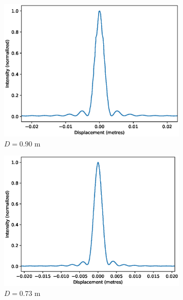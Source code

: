 \documentclass[11pt]{article}
\begin{document}
        \begin{figure}[H]
        \centering
        \begin{subfigure}[b]{0.49\textwidth}
                \includegraphics[width=\textwidth]{Slit1.eps}
                \caption{$D = 0.90$ m}
        \end{subfigure}
        \begin{subfigure}[b]{0.49\textwidth}
                \includegraphics[width=\textwidth]{Slit2.eps}
                \caption{$D = 0.73$ m}
        \end{subfigure}
        \begin{subfigure}[b]{0.49\textwidth}

\end{subfigure}
\end{figure}
\end{document}
